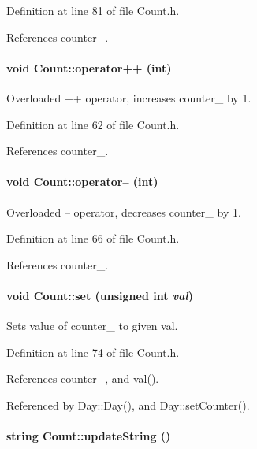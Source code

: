 Definition at line 81 of file Count.h.

References counter\_\-.\hypertarget{classCount_Counta3}{
\paragraph[operator++]{\setlength{\rightskip}{0pt plus 5cm}void Count::operator++ (int)}\hfill}
\label{classCount_Counta3}


Overloaded ++ operator, increases counter\_\- by 1. 

Definition at line 62 of file Count.h.

References counter\_\-.\hypertarget{classCount_Counta4}{
\paragraph[operator--]{\setlength{\rightskip}{0pt plus 5cm}void Count::operator-- (int)}\hfill}
\label{classCount_Counta4}


Overloaded -- operator, decreases counter\_\- by 1. 

Definition at line 66 of file Count.h.

References counter\_\-.\hypertarget{classCount_Counta6}{
\paragraph[set]{\setlength{\rightskip}{0pt plus 5cm}void Count::set (unsigned int {\em val})}\hfill}
\label{classCount_Counta6}


Sets value of counter\_\- to given val. 

Definition at line 74 of file Count.h.

References counter\_\-, and val().

Referenced by Day::Day(), and Day::set\-Counter().\hypertarget{classCount_Counta8}{
\paragraph[updateString]{\setlength{\rightskip}{0pt plus 5cm}string Count::update\-String ()}\hfill}
\label{classCount_Counta8}



